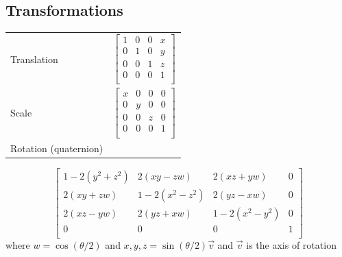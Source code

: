\documentclass{article}
\begin{document}
\begin{landscape}
\begin{multicols}{3}
            \subsection{Transformations}
            \begin{small}
                \begin{tabular}{l l}
                    Translation & {
                    $$
                    \begin{bmatrix}
                        1 & 0 & 0 & x \\
                        0 & 1 & 0 & y \\
                        0 & 0 & 1 & z \\
                        0 & 0 & 0 & 1 \\
                    \end{bmatrix}
                    $$
                    } \\
                    Scale & {
                    $$
                    \begin{bmatrix}
                        x & 0 & 0 & 0 \\
                        0 & y & 0 & 0 \\
                        0 & 0 & z & 0 \\
                        0 & 0 & 0 & 1 \\
                    \end{bmatrix}
                    $$
                    } \\
                    Rotation (quaternion) & {
                    } \\
                \end{tabular}
                $$
                \begin{bmatrix}
                    1 - 2(y^2 + z^2) & 2(xy - zw )& 2(xz + yw) & 0 \\
                    2(xy + zw) & 1 - 2(x^2 - z^2) & 2(yz - xw) & 0 \\
                    2(xz - yw) & 2(yz + xw) & 1 - 2(x^2 - y^2) & 0 \\
                    0 & 0 & 0 & 1 \\
                \end{bmatrix}$$
                where $w = \cos(\theta/2)$ and $x, y, z = \sin(\theta/2)\vec v$ and $\vec v$ is the axis of rotation
            \end{small}
        \end{multicols}
    \end{landscape}
\end{document}
